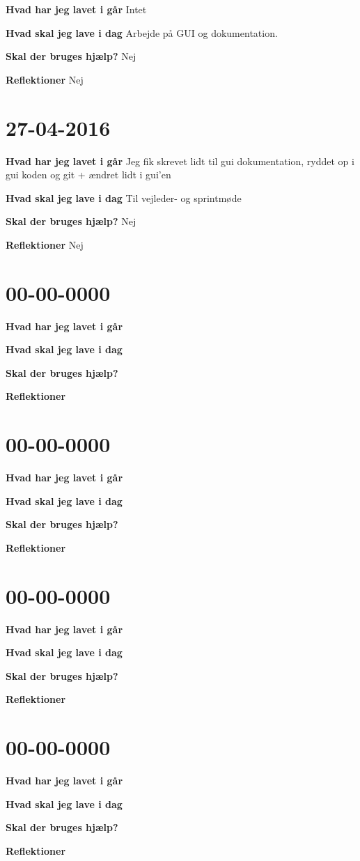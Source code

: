 \documentclass{article}
\begin{document}
	\textbf{Hvad har jeg lavet i går} Intet
	
	\textbf{Hvad skal jeg lave i dag} Arbejde på GUI og dokumentation.
	
	\textbf{Skal der bruges hjælp?} Nej
	
	\textbf{Reflektioner} Nej
	
	\section{27-04-2016}
	
	\textbf{Hvad har jeg lavet i går} Jeg fik skrevet lidt til gui dokumentation, ryddet op  i gui koden og git + ændret lidt i gui'en
	
	\textbf{Hvad skal jeg lave i dag} Til vejleder- og sprintmøde
	
	\textbf{Skal der bruges hjælp?} Nej
	
	\textbf{Reflektioner} Nej
	
	\section{00-00-0000}
	
	\textbf{Hvad har jeg lavet i går}
	
	\textbf{Hvad skal jeg lave i dag}
	
	\textbf{Skal der bruges hjælp?}
	
	\textbf{Reflektioner}
	
	\section{00-00-0000}
	
	\textbf{Hvad har jeg lavet i går}
	
	\textbf{Hvad skal jeg lave i dag}
	
	\textbf{Skal der bruges hjælp?}
	
	\textbf{Reflektioner}
	
	\section{00-00-0000}
	
	\textbf{Hvad har jeg lavet i går}
	
	\textbf{Hvad skal jeg lave i dag}
	
	\textbf{Skal der bruges hjælp?}
	
	\textbf{Reflektioner}
	
	\section{00-00-0000}
	
	\textbf{Hvad har jeg lavet i går}
	
	\textbf{Hvad skal jeg lave i dag}
	
	\textbf{Skal der bruges hjælp?}
	
	\textbf{Reflektioner}
		
\end{document}
